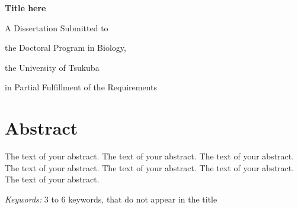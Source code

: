 \documentclass[12pt, a4paper]{report} %
\begin{document}
\def\spacingset#1{\renewcommand{\baselinestretch}%
{#1}\small\normalsize} \spacingset{1}


%


    \thispagestyle{empty}
    \vspace*{30mm}
    \begin{center}
    \LARGE{\bf Title here}
    \end{center}

    \vspace{6cm}
    \centerline{A Dissertation Submitted to}\par
    \centerline{the Doctoral Program in Biology,}\par
    \centerline{the University of Tsukuba}\par
    \centerline{in Partial Fulfillment of the Requirements}\par

    \vspace{2cm}
    \centerline{\Large{\bf }}
    \clearpage



\newpage

\chapter*{Abstract}
The text of your abstract. The text of your abstract. The text of your
abstract. The text of your abstract. The text of your abstract. The text
of your abstract. The text of your abstract.

\noindent%
{\it Keywords:} 3 to 6 keywords, that do not appear in the title
\vfill

\newpage
\spacingset{1.45} %
\end{document}

